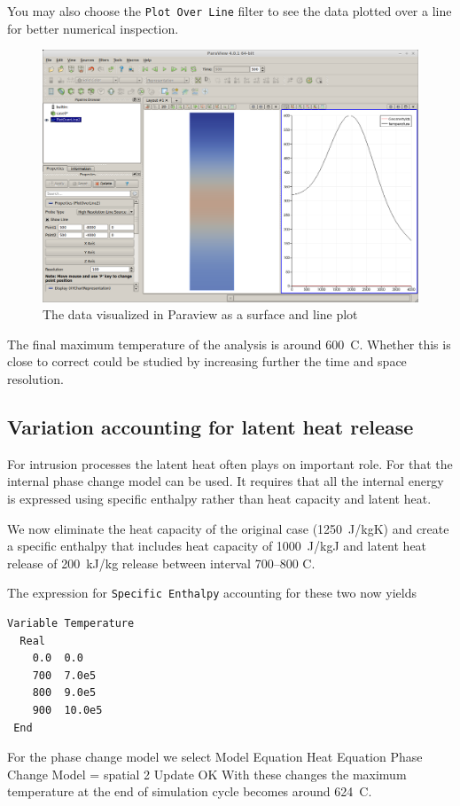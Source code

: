 You may also choose the \texttt{Plot Over Line} filter to see the data plotted 
over a line for better numerical inspection. 

\begin{figure}
\begin{center}
\includegraphics[width=140mm]{GeoSlabParaview}
\caption{The data visualized in Paraview as a surface and line plot}
\label{fg:GeoSlabParaview}
\end{center}
\end{figure}

The final maximum temperature of the analysis is around 600~C. Whether this is close to correct could
be studied by increasing further the time and space resolution. 


\subsection{Variation accounting for latent heat release}

For intrusion processes the latent heat often plays on important role. 
For that the internal phase change model can be used. It requires that 
all the internal energy is expressed using specific enthalpy rather than
heat capacity and latent heat. 

We now eliminate the heat capacity of the original case (1250~J/kgK) and
create a specific enthalpy that includes heat capacity of 1000~J/kgJ 
and latent heat release of 200~kJ/kg release between interval 700--800 C.

The expression for \texttt{Specific Enthalpy} accounting for these two now yields
\begin{verbatim}
Variable Temperature
  Real
    0.0  0.0
    700  7.0e5
    800  9.0e5
    900  10.0e5
 End 
\end{verbatim}
For the phase change model we select 
\ttbegin
Model
  Equation
    Heat Equation
      Phase Change Model = spatial 2
  Update
  OK
\ttend        
With these changes the maximum temperature at the end of simulation cycle 
becomes around 624~C.  


\hfill
\mbox{}






